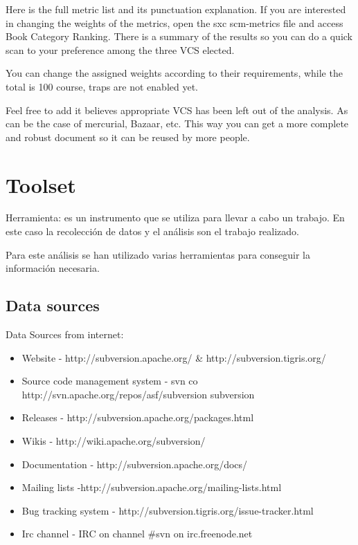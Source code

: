 \documentclass[11pt]{scrartcl}
\begin{document}
\par Here is the full metric list and its punctuation explanation. If you are interested in changing the weights of the metrics, open the sxc scm-metrics file and access Book Category Ranking. There is a summary of the results so you can do a quick scan to your preference among the three VCS elected.

\par You can change the assigned weights according to their requirements, while the total is 100 course, traps are not enabled yet.

\par Feel free to add it believes appropriate VCS has been left out of the analysis. As can be the case of mercurial, Bazaar, etc. This way you can get a more complete and robust document so it can be reused by more people.

\section{Toolset}

\par Herramienta: es un instrumento que se utiliza para llevar a cabo un trabajo. En este caso la recolección de datos y el análisis son el trabajo realizado.

\par Para este análisis se han utilizado varias herramientas para conseguir la información necesaria.

\subsection{Data sources}

Data Sources from internet:

\begin{itemize}
    \item Website - http://subversion.apache.org/ \& http://subversion.tigris.org/
    \item Source code management system - svn co http://svn.apache.org/repos/asf/subversion subversion
    \item Releases - http://subversion.apache.org/packages.html
    \item Wikis - http://wiki.apache.org/subversion/
    \item Documentation - http://subversion.apache.org/docs/
    \item Mailing lists -http://subversion.apache.org/mailing-lists.html
    \item Bug tracking system - http://subversion.tigris.org/issue-tracker.html
    \item Irc channel - IRC on channel \#svn on irc.freenode.net
\end{itemize}
\end{document}
